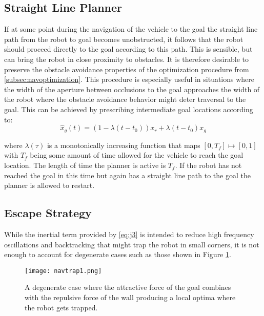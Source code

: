 \subsection{Straight Line Planner}

If at some point during the navigation of the vehicle to the goal the straight line path from the robot to goal becomes
unobstructed, it follows that the robot should proceed directly to the goal according to this path. This is sensible, but
can bring the robot in close proximity to obstacles. It is therefore desirable to preserve the obstacle avoidance properties
of the optimization procedure from \ref{subsec:navoptimization}. This procedure is especially useful in situations where the width of the aperture between 
occlusions to the goal approaches the width of the robot where the obstacle avoidance behavior might deter traversal to the goal. 
This can be achieved by prescribing intermediate goal locations
according to:
\begin{equation}
	\hat x_g(t) = (1 - \lambda(t - t_0)) x_r + \lambda (t - t_0) x_g
\label{eq:line_path1}
\end{equation}

where $\lambda(\tau)$ is a monotonically increasing function that maps $[0, T_f] \mapsto [0,1]$ with $T_f$ being some 
amount of time allowed for the vehicle to reach the goal location. The length of time the planner is active is $T_f$.
If the robot has not reached the goal in this time but again has a straight line path to the goal the planner is allowed
to restart.

\subsection{Escape Strategy}

While the inertial term provided by \ref{eq:j3} is intended to reduce high frequency oscillations and backtracking that might
trap the robot in small corners, it is not enough to account for degenerate cases such as those shown in Figure \ref{fig:trap1}.

\begin{figure}
	\centering
	\texttt{[image: navtrap1.png]}
	\caption
	{A degenerate case where the attractive force of the goal combines with the repulsive force of the wall producing a local optima
	where the robot gets trapped.}
	\label{fig:trap1}
\end{figure}

